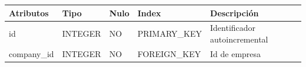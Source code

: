 \documentclass[12pt,a4paperpaper,]{report}
\begin{document}
\begin{longtable}[]{@{}lllll@{}}
\toprule
\begin{minipage}[b]{0.21\columnwidth}\raggedright\strut
Atributos\strut
\end{minipage} & \begin{minipage}[b]{0.19\columnwidth}\raggedright\strut
Tipo\strut
\end{minipage} & \begin{minipage}[b]{0.16\columnwidth}\raggedright\strut
Nulo\strut
\end{minipage} & \begin{minipage}[b]{0.19\columnwidth}\raggedright\strut
Index\strut
\end{minipage} & \begin{minipage}[b]{0.11\columnwidth}\raggedright\strut
Descripción\strut
\end{minipage}\tabularnewline
\midrule
\endhead
\begin{minipage}[t]{0.21\columnwidth}\raggedright\strut
id\strut
\end{minipage} & \begin{minipage}[t]{0.19\columnwidth}\raggedright\strut
INTEGER\strut
\end{minipage} & \begin{minipage}[t]{0.16\columnwidth}\raggedright\strut
NO\strut
\end{minipage} & \begin{minipage}[t]{0.19\columnwidth}\raggedright\strut
PRIMARY\_KEY\strut
\end{minipage} & \begin{minipage}[t]{0.11\columnwidth}\raggedright\strut
Identificador autoincremental\strut
\end{minipage}\tabularnewline
\begin{minipage}[t]{0.21\columnwidth}\raggedright\strut
company\_id\strut
\end{minipage} & \begin{minipage}[t]{0.19\columnwidth}\raggedright\strut
INTEGER\strut
\end{minipage} & \begin{minipage}[t]{0.16\columnwidth}\raggedright\strut
NO\strut
\end{minipage} & \begin{minipage}[t]{0.19\columnwidth}\raggedright\strut
FOREIGN\_KEY\strut
\end{minipage} & \begin{minipage}[t]{0.11\columnwidth}\raggedright\strut
Id de empresa\strut
\end{minipage}\tabularnewline

\end{longtable}
\end{document}
